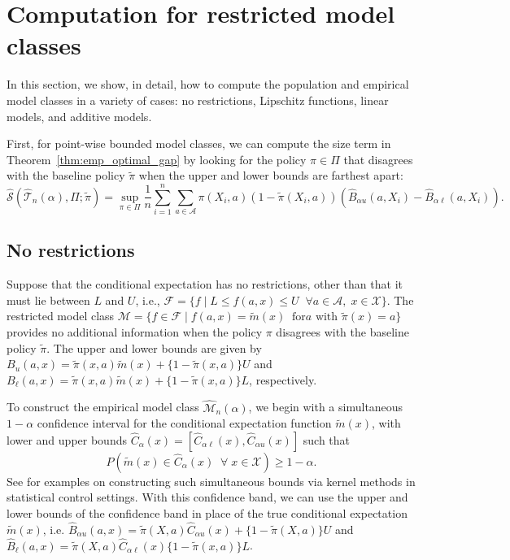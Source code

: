 \documentclass[12pt]{article}
\theoremstyle{definition}
\newcommand{\<}{\langle}
\renewcommand{\>}{\rangle}
\newcommand\mcal[1]{\ensuremath{\mathcal{#1}}}
\begin{document}
\section{Computation for restricted model classes}
\label{sec:representative_cases}

In this section, we show, in detail, how to compute the population and
empirical model classes in a variety of cases: no restrictions,
Lipschitz functions, linear models, and additive models.


First, for point-wise bounded model classes, we can compute the size
term in Theorem~\ref{thm:emp_optimal_gap} by looking for the policy
$\pi \in \Pi$ that disagrees with the baseline policy $\tilde{\pi}$
when the upper and lower bounds are farthest apart:
\begin{equation}
  \label{eq:bounded_sizes}
  \widehat{\mathcal{S}}(\widehat{\mcal{T}}_n(\alpha), \Pi; \tilde{\pi}) =%
  \sup_{\pi \in \Pi } \frac{1}{n}\sum_{i=1}^n \sum_{a \in \mathcal{A}} \pi(X_i, a) (1 - \tilde{\pi}(X_i, a)) \left(\widehat{B}_{\alpha u}(a, X_i) - \widehat{B}_{\alpha \ell}(a, X_i)\right).
\end{equation}

\subsection{No restrictions}
\label{sec:no_restriction}

Suppose that the conditional expectation has no restrictions, other
than that it must lie between $L$ and $U$, i.e.,
$\mcal{F} = \{f \mid L \leq f(a,x) \leq U \;\; \forall a\in\mcal{A},
\; x \in \mcal{X}\}$. The restricted model class
$\mcal{M} = \{f \in \mcal{F} \mid f(a,x) = \tilde{m}(x) \;\; \text{for
} a \text{ with } \tilde{\pi}(x) = a\}$ provides no additional
information when the policy $\pi$ disagrees with the baseline policy
$\tilde{\pi}$. The upper and lower bounds are given by
$B_u(a,x) = \tilde{\pi}(x, a)\tilde{m}(x) + \{1 - \tilde{\pi}(
x,a)\} U $ and $B_\ell(a,x) = \tilde{\pi}(x, a)\tilde{m}(x) + \{1 - \tilde{\pi}(
x,a)\} L$, respectively.

To construct the empirical model class $\widehat{\mcal{M}}_n(\alpha)$,
we begin with a simultaneous $1-\alpha$ confidence interval for the
conditional expectation function $\tilde{m}(x)$, with lower and upper
bounds
$\widehat{C}_\alpha(x) = [\widehat{C}_{\alpha \ell} (x),
\widehat{C}_{\alpha u}(x)]$ such that
\begin{equation}
  \label{eq:simul_band}
  P\left(\tilde{m}(x) \in \widehat{C}_\alpha(x) \;\; \forall \; x \in \mathcal{X} \right) \geq 1 - \alpha.
\end{equation}
See \citet{Srinivas2010,Chowdhury2017,Fiedler2021} for examples on
constructing such simultaneous bounds via kernel methods in
statistical control settings. With this confidence band, we can use
the upper and lower bounds of the confidence band in place of the true
conditional expectation $\tilde{m}(x)$, i.e.
$\widehat{B}_{\alpha u}(a,x) = \tilde{\pi}(X, a)\widehat{C}_{\alpha
  u}(x) + \{1 - \tilde{\pi}(X, a)\} U $ and
$\widehat{B}_\ell(a,x) = \tilde{\pi}(X, a)\widehat{C}_{\alpha
  \ell}(x) \{1 - \tilde{\pi}(x, a)\} L$. 
\end{document}
